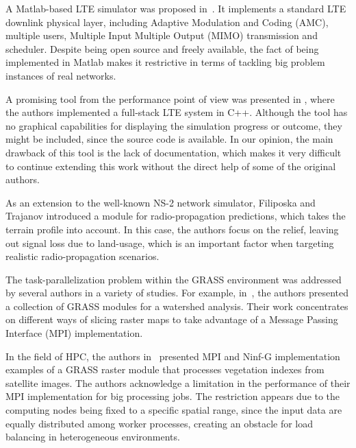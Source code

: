 A Matlab-based LTE simulator was proposed in~\cite{Mehlfuhrer_The_Vienna_LTE_Simulators_enabling_reproducibility_in_wireless_communications_research:2011}.
It implements a standard LTE downlink physical layer, including Adaptive
Modulation and Coding (AMC),
multiple users, Multiple Input Multiple Output (MIMO)
transmission and scheduler. Despite being open source and freely available,
the fact of being implemented in Matlab makes it restrictive in terms
of tackling big problem instances of real networks.

A promising tool from the performance point of view was presented
in \cite{Piro_Simulating_LTE_cellular_systems_an_open_source_framework:2011},
where the authors implemented a full-stack LTE system in C++. Although
the tool has no graphical capabilities for displaying the simulation
progress or outcome, they might be included, since the source code
is available. In our opinion, the main drawback of this tool is the
lack of documentation, which makes it very difficult to continue extending
this work without the direct help of some of the original authors.

As an extension to the well-known NS-2 network simulator, Filiposka
and Trajanov \cite{Filiposka_Terrain_aware_three_dimensional_radio_propagation_model_extension_for_NS2:2011}
introduced a module for radio-propagation predictions, which takes
the terrain profile into account. In this case, the authors focus
on the relief, leaving out signal loss due to land-usage, which is
an important factor when targeting realistic radio-propagation scenarios.

\bigskip{}


The task-parallelization problem within the GRASS environment was
addressed by several authors in a variety of studies. For example,
in~\cite{Campos_Parallel_modelling_in_GIS:2012}, the authors presented
a collection of GRASS modules for a watershed analysis. Their work
concentrates on different ways of slicing raster maps to take advantage
of a Message Passing Interface (MPI)
implementation.

In the field of HPC, the authors in~\cite{Akhter_Porting_GRASS_raster_module_to_distributed_computing:2007}
presented MPI and Ninf-G implementation examples of a GRASS raster
module that processes vegetation indexes from satellite images. The
authors acknowledge a limitation in the performance of their MPI implementation
for big processing jobs. The restriction appears due to the computing
nodes being fixed to a specific spatial range, since the input data
are equally distributed among worker processes, creating an obstacle
for load balancing in heterogeneous environments.

